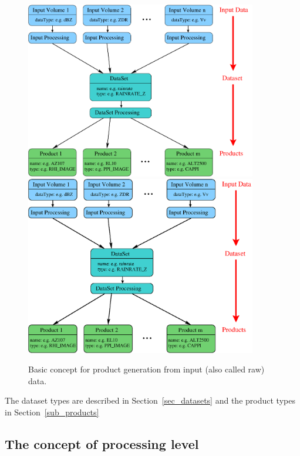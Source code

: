 \documentclass[a4paper,11pt,pdftex,twoside]{scrartcl}
\begin{document}
{{{\begin{figure}[htbp]
  \begin{center}
    \ifpdf
      \includegraphics[width=0.9\textwidth]{./figures/main_concept.pdf}
    \else
      \includegraphics[width=0.9\textwidth]{./figures/main_concept.eps}
    \fi
  \end{center}
  \caption{Basic concept for product generation from input (also called raw) data.}
  \label{fig_main_concept}
\end{figure}

The dataset types are described in Section~\ref{sec_datasets}
and the product types in Section~\ref{sub_products}


\subsection{The concept of processing level}

}}}
\end{document}
